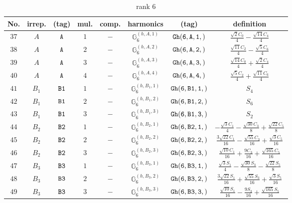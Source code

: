 \documentclass[fleqn,8pt]{jsarticle}
\begin{document}
\begin{table}[ht!]
\begin{center}
\caption{rank 6}
\renewcommand{\arraystretch}{1.3}
\begin{tabular}{cccccccc} \hline \hline
No. & irrep. & (tag) & mul. & comp. & harmonics & (tag) & definition \\ \hline
$ 37 $ & $ A $ & $ {\tt A} $ & $ 1 $ & $ - $ & $ \mathbb{G}_{6}^{(h,A,1)} $ & $ {\tt Gh(6,A,1,)} $ & $ \frac{\sqrt{2} C_{0}}{4} - \frac{\sqrt{14} C_{4}}{4} $ \\
$ 38 $ & $ A $ & $ {\tt A} $ & $ 2 $ & $ - $ & $ \mathbb{G}_{6}^{(h,A,2)} $ & $ {\tt Gh(6,A,2,)} $ & $ \frac{\sqrt{11} C_{2}}{4} - \frac{\sqrt{5} C_{6}}{4} $ \\
$ 39 $ & $ A $ & $ {\tt A} $ & $ 3 $ & $ - $ & $ \mathbb{G}_{6}^{(h,A,3)} $ & $ {\tt Gh(6,A,3,)} $ & $ \frac{\sqrt{14} C_{0}}{4} + \frac{\sqrt{2} C_{4}}{4} $ \\
$ 40 $ & $ A $ & $ {\tt A} $ & $ 4 $ & $ - $ & $ \mathbb{G}_{6}^{(h,A,4)} $ & $ {\tt Gh(6,A,4,)} $ & $ \frac{\sqrt{5} C_{2}}{4} + \frac{\sqrt{11} C_{6}}{4} $ \\
$ 41 $ & $ B_{1} $ & $ {\tt B1} $ & $ 1 $ & $ - $ & $ \mathbb{G}_{6}^{(h,B_{1},1)} $ & $ {\tt Gh(6,B1,1,)} $ & $ S_{4} $ \\
$ 42 $ & $ B_{1} $ & $ {\tt B1} $ & $ 2 $ & $ - $ & $ \mathbb{G}_{6}^{(h,B_{1},2)} $ & $ {\tt Gh(6,B1,2,)} $ & $ S_{6} $ \\
$ 43 $ & $ B_{1} $ & $ {\tt B1} $ & $ 3 $ & $ - $ & $ \mathbb{G}_{6}^{(h,B_{1},3)} $ & $ {\tt Gh(6,B1,3,)} $ & $ S_{2} $ \\
$ 44 $ & $ B_{2} $ & $ {\tt B2} $ & $ 1 $ & $ - $ & $ \mathbb{G}_{6}^{(h,B_{2},1)} $ & $ {\tt Gh(6,B2,1,)} $ & $ - \frac{\sqrt{3} C_{1}}{4} - \frac{\sqrt{30} C_{3}}{8} + \frac{\sqrt{22} C_{5}}{8} $ \\
$ 45 $ & $ B_{2} $ & $ {\tt B2} $ & $ 2 $ & $ - $ & $ \mathbb{G}_{6}^{(h,B_{2},2)} $ & $ {\tt Gh(6,B2,2,)} $ & $ \frac{3 \sqrt{22} C_{1}}{16} - \frac{\sqrt{55} C_{3}}{16} + \frac{\sqrt{3} C_{5}}{16} $ \\
$ 46 $ & $ B_{2} $ & $ {\tt B2} $ & $ 3 $ & $ - $ & $ \mathbb{G}_{6}^{(h,B_{2},3)} $ & $ {\tt Gh(6,B2,3,)} $ & $ \frac{\sqrt{10} C_{1}}{16} + \frac{9 C_{3}}{16} + \frac{\sqrt{165} C_{5}}{16} $ \\
$ 47 $ & $ B_{3} $ & $ {\tt B3} $ & $ 1 $ & $ - $ & $ \mathbb{G}_{6}^{(h,B_{3},1)} $ & $ {\tt Gh(6,B3,1,)} $ & $ \frac{\sqrt{3} S_{1}}{4} - \frac{\sqrt{30} S_{3}}{8} - \frac{\sqrt{22} S_{5}}{8} $ \\
$ 48 $ & $ B_{3} $ & $ {\tt B3} $ & $ 2 $ & $ - $ & $ \mathbb{G}_{6}^{(h,B_{3},2)} $ & $ {\tt Gh(6,B3,2,)} $ & $ \frac{3 \sqrt{22} S_{1}}{16} + \frac{\sqrt{55} S_{3}}{16} + \frac{\sqrt{3} S_{5}}{16} $ \\
$ 49 $ & $ B_{3} $ & $ {\tt B3} $ & $ 3 $ & $ - $ & $ \mathbb{G}_{6}^{(h,B_{3},3)} $ & $ {\tt Gh(6,B3,3,)} $ & $ \frac{\sqrt{10} S_{1}}{16} - \frac{9 S_{3}}{16} + \frac{\sqrt{165} S_{5}}{16} $ \\
 \hline \hline
\end{tabular}
\end{center}
\end{table}
\end{document}
